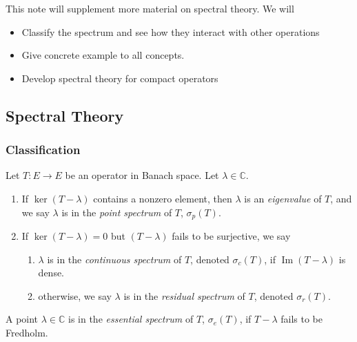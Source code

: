 
This note will supplement more material on spectral theory. We will
\begin{itemize}
	\item Classify the spectrum and see how they interact with other operations
	\item Give concrete example to all concepts.
	\item Develop spectral theory for compact operators
\end{itemize}

\subsection{Spectral Theory}

\subsubsection{Classification}

\begin{definition}
	\label{defn:PointSpectrumCont}
	Let $T: E \to E$ be an operator in Banach space. Let $\lambda \in \mathbb{C}$.
	\begin{enumerate}
		\item If $\operatorname{ker} (T - \lambda)$ contains a nonzero element, then $\lambda$ is an \textit{eigenvalue} of $T$, and we say $\lambda$ is in the \textit{point spectrum} of $T$, $\sigma_p(T)$.
		\item If $\operatorname{ker} (T - \lambda) = 0$ but $(T - \lambda)$ fails to be surjective, we say
			\begin{enumerate}
				\item $\lambda$ is in the \textit{continuous spectrum} of $T$, denoted $\sigma_c(T)$, if $\operatorname{Im} (T - \lambda)$ is dense.
				\item otherwise, we say $\lambda$ is in the \textit{residual spectrum} of $T$, denoted $\sigma_r(T)$.
			\end{enumerate}
	\end{enumerate}
	
\end{definition}

\begin{definition}
	\label{defn:EssentialSpectrum}
	A point $\lambda \in \mathbb{C}$ is in the \textit{essential spectrum} of $T$, $\sigma_{e}(T)$, if $T - \lambda$ fails to be Fredholm.
\end{definition}

